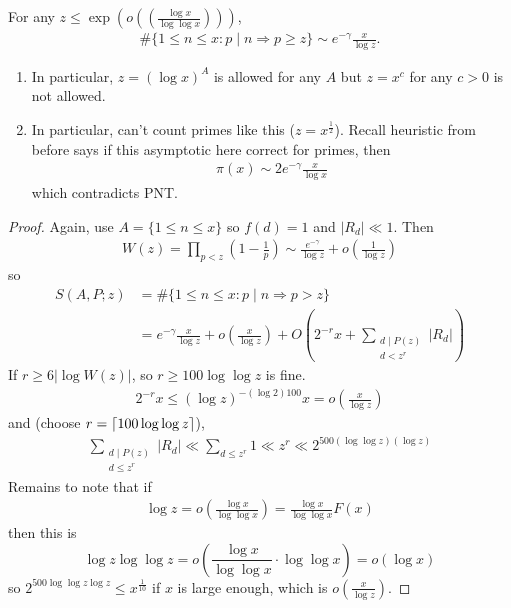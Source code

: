 \documentclass{article}
\newcommand{\1}{\mathbbm{1}}
\DeclarePairedDelimiter\ceil{\lceil}{\rceil}
\begin{document}
\begin{cor}
  For any $z \leq \exp(o((\frac{\log x}{\log \log x})))$,
  \begin{align*}
    \#\{1 \leq n \leq x : p \mid n \Rightarrow p \geq z\} \sim e^{-\gamma} \frac{x}{\log z}.
  \end{align*}
\end{cor}
\begin{remark}\leavevmode
  \begin{enumerate}[label=(\arabic*)]
    \item In particular, $z = (\log x)^A$ is allowed for any $A$ but $z = x^c$ for any $c > 0$ is not allowed.
    \item In particular, can't count primes like this ($z = x^{\frac 12}$).
      Recall heuristic from before says if this asymptotic here correct for primes, then
      \begin{align*}
        \pi(x) \sim 2 e^{-\gamma} \frac{x}{\log x}
      \end{align*}
      which contradicts PNT.
  \end{enumerate}
\end{remark}
\begin{proof}
  Again, use $A = \{1 \leq n \leq x\}$ so $f(d) = 1$ and $|R_d| \ll 1$. Then
  \begin{align*}
    W(z) = \prod_{p < z} \left(1 - \frac 1p\right) \sim \frac{e^{-\gamma}}{\log z} + o\left(\frac{1}{\log z}\right)
  \end{align*}
  so
  \begin{align*}
    S(A,P;z) &= \#\{1 \leq n \leq x : p \mid n \Rightarrow p > z\} \\
    &= e^{-\gamma} \frac{x}{\log z} + o\left(\frac{x}{\log z}\right)+ O\left(2^{-r} x + \sum_{\substack{d \mid P(z) \\ d < z^r}} |R_d|\right)
  \end{align*}
  If $r \geq 6 |\log W(z)|$, so $r \geq 100 \log \log z$ is fine.
  \begin{align*}
    2^{-r} x \leq (\log z)^{- (\log 2) 100} x = o\left(\frac{x}{\log z}\right)
  \end{align*}
  and
  (choose $r = \ceil{100 \log \log z}$),
  \begin{align*}
    \sum_{\substack{d \mid P(z) \\ d \leq z^r}} |R_d| \ll \sum_{d \leq z^r} 1 \ll z^r \ll 2^{500 (\log \log z)(\log z)}
  \end{align*}
  Remains to note that if
  \begin{align*}
    \log z = o\left(\frac{\log x}{\log \log x}\right) = \frac{\log x}{\log \log x} F(x)
  \end{align*}
  then this is
  \begin{equation*}
    \log z \log \log z = o\left(\frac{\log x}{\log \log x} \cdot \log \log x\right) = o(\log x)
  \end{equation*}
  so $2^{500 \log \log z \log z} \leq x^{\frac{1}{10}}$ if $x$ is large enough, which is $o(\frac{x}{\log z})$.
\end{proof}
\end{document}
